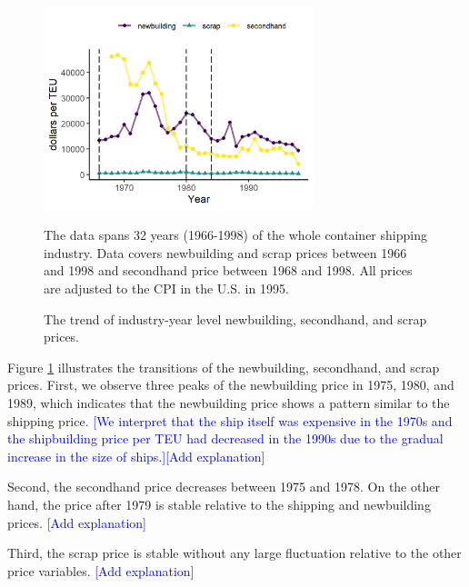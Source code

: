 \documentclass[11pt]{article}
\begin{document}
\begin{figure}[!ht]
\begin{center}
\includegraphics[width = 0.7\textwidth]{figuretable/price_newbuilding_secondhand_scrap.png}
\caption{The trend of industry-year level newbuilding, secondhand, and scrap prices.}
\label{fg:price_newbuilding_secondhand_scrap}
\end{center}
\footnotesize
The data spans 32 years (1966-1998) of the whole container shipping industry. Data covers newbuilding and scrap prices between 1966 and 1998 and secondhand price between 1968 and 1998. All prices are adjusted to the CPI in the U.S. in 1995. 
\end{figure}

Figure \ref{fg:price_newbuilding_secondhand_scrap} illustrates the transitions of the newbuilding, secondhand, and scrap prices. First, we observe three peaks of the newbuilding price in 1975, 1980, and 1989, which indicates that the newbuilding price shows a pattern similar to the shipping price. \textcolor{blue}{[We interpret that the ship itself was expensive in the 1970s and the shipbuilding price per TEU had decreased in the 1990s due to the gradual increase in the size of ships.]}\textcolor{blue}{[Add explanation]}

Second, the secondhand price decreases between 1975 and 1978. On the other hand, the price after 1979 is stable relative to the shipping and newbuilding prices. \textcolor{blue}{[Add explanation]}

Third, the scrap price is stable without any large fluctuation relative to the other price variables.  \textcolor{blue}{[Add explanation]}
\end{document}
